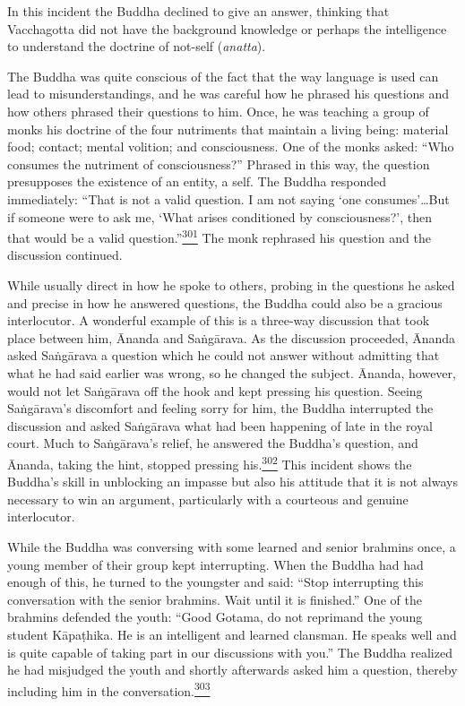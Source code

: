 In this incident the Buddha declined to give an answer, thinking that
Vacchagotta did not have the background knowledge or perhaps the
intelligence to understand the doctrine of not-self (\emph{anatta}).

The Buddha was quite conscious of the fact that the way language is used
can lead to misunderstandings, and he was careful how he phrased his
questions and how others phrased their questions to him. Once, he was
teaching a group of monks his doctrine of the four nutriments that
maintain a living being: material food; contact; mental volition; and
consciousness. One of the monks asked: ``Who consumes the nutriment of
consciousness?'' Phrased in this way, the question presupposes the
existence of an entity, a self. The Buddha responded immediately: ``That
is not a valid question. I am not saying `one consumes'\ldots But if
someone were to ask me, `What arises conditioned by consciousness?',
then that would be a valid
question.''\label{footprints_split_010.html_fnref301}\hyperref[footprints_split_024.htmlux5cux23fn301]{\textsuperscript{301}}
The monk rephrased his question and the discussion continued.

While usually direct in how he spoke to others, probing in the questions
he asked and precise in how he answered questions, the Buddha could also
be a gracious interlocutor. A wonderful example of this is a three-way
discussion that took place between him, Ānanda and Saṅgārava. As the
discussion proceeded, Ānanda asked Saṅgārava a question which he could
not answer without admitting that what he had said earlier was wrong, so
he changed the subject. Ānanda, however, would not let Saṅgārava off the
hook and kept pressing his question. Seeing Saṅgārava's discomfort and
feeling sorry for him, the Buddha interrupted the discussion and asked
Saṅgārava what had been happening of late in the royal court. Much to
Saṅgārava's relief, he answered the Buddha's question, and Ānanda,
taking the hint, stopped pressing
his.\label{footprints_split_010.html_fnref302}\hyperref[footprints_split_024.htmlux5cux23fn302]{\textsuperscript{302}}
This incident shows the Buddha's skill in unblocking an impasse but also
his attitude that it is not always necessary to win an argument,
particularly with a courteous and genuine interlocutor.

While the Buddha was conversing with some learned and senior brahmins
once, a young member of their group kept interrupting. When the Buddha
had had enough of this, he turned to the youngster and said: ``Stop
interrupting this conversation with the senior brahmins. Wait until it
is finished.'' One of the brahmins defended the youth: ``Good Gotama, do
not reprimand the young student Kāpaṭhika. He is an intelligent and
learned clansman. He speaks well and is quite capable of taking part in
our discussions with you.'' The Buddha realized he had misjudged the
youth and shortly afterwards asked him a question, thereby including him
in the
conversation.\label{footprints_split_010.html_fnref303}\hyperref[footprints_split_024.htmlux5cux23fn303]{\textsuperscript{303}}

